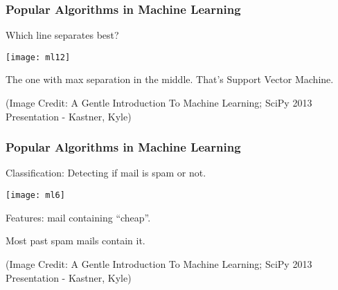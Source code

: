 \begin{frame}[fragile]\frametitle{Popular Algorithms in Machine Learning}
Which line separates best?
\begin{center}
\texttt{[image: ml12]}
\end{center}
The one with max separation in the middle. That's Support Vector Machine.

\tiny{(Image Credit: A Gentle Introduction To Machine Learning; SciPy 2013 Presentation - Kastner, Kyle)}

\end{frame}
%
%
%
%
%
%

\begin{frame}[fragile]\frametitle{Popular Algorithms in Machine Learning}
Classification: Detecting if mail is spam or not.
\begin{center}
\texttt{[image: ml6]}
\end{center}
Features: mail containing ``cheap''. 

Most past spam mails contain it.

\tiny{(Image Credit: A Gentle Introduction To Machine Learning; SciPy 2013 Presentation - Kastner, Kyle)}
\end{frame}


